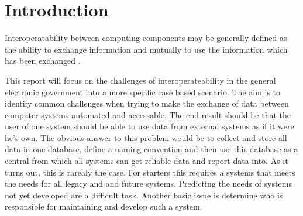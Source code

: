\part{Introduction}
Interoperatability between computing components may be generally defined as the ability to exchange information and mutually to use the information which has been exchanged \cite{12}. 

This report will focus on the challenges of interoperateability in the general electronic government  into a more specific case based scenario. The aim is to identify common challenges when trying to make the exchange of data between computer systems automated and accessable. The end result should be that the user of one system should be able to use data from external systems as if it were he's own. The obvious answer to this problem would be to collect and store all data in one database, define a naming convention and then use this database as a central from which all systems can get reliable data and report data into. As it turns out, this is rarealy the case. For starters this requires a systems that meets the needs for all legacy and and future systems. Predicting the needs of systems not yet developed are a difficult task. Another basic issue is determine who is responsible for maintaining and develop such a system. 

